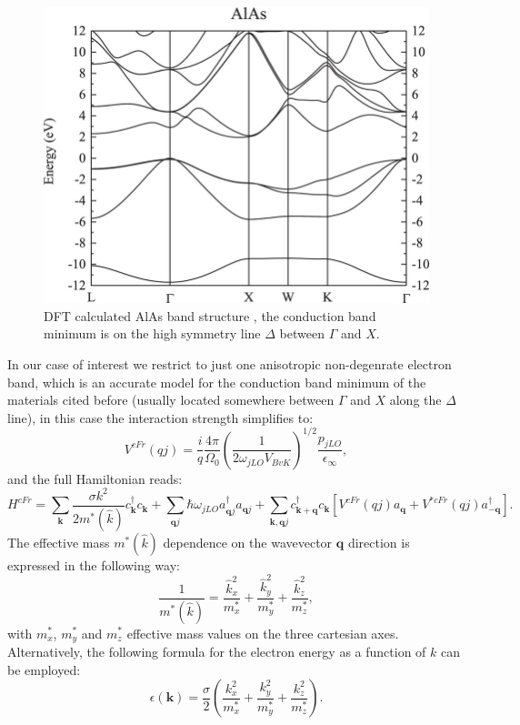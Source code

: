 \begin{figure}[H]
    \centering
    \includegraphics[scale=1.0]{Electronic-band-structure-for-AlAs.jpg}
    \caption{DFT calculated AlAs band structure \cite{da2021pseudopotential}, the conduction band minimum is on the high symmetry 
    line $\Delta$ between $\Gamma$ and $X$.}
    \label{fig:AlAs_bands}
\end{figure}
In our case of interest we restrict to just one anisotropic non-degenrate electron band, which is an accurate model for the conduction band minimum of 
the materials cited before (usually located somewhere between $\Gamma$ and $X$ along the $\Delta$ line), in this case the interaction 
strength simplifies to:
\begin{equation}
    V^{cFr}(qj)=\frac{i}{q}\frac{4\pi}{\Omega_0}\left(\frac{1}{2\omega_{jLO}V_{BvK}}\right)^{1/2}\frac{p_{jLO}}{\epsilon_\infty},
    \label{coupling_strength_anisotropic}
\end{equation}
and the full Hamiltonian reads:
\begin{equation}
    H^{cFr}=\sum_{\mathbf{k}}\frac{\sigma k^2}{2m^*(\hat{k})}c^\dagger_\mathbf{k}c_\mathbf{k}+\sum_{\mathbf{q}j}\hbar\omega_{jLO}a^\dagger_{\mathbf{q}j}a_{\mathbf{q}j}+\sum_{\mathbf{k},\mathbf{q}j}c^\dagger_{\mathbf{k}+\mathbf{q}}c_\mathbf{k}\left[V^{cFr}(qj)a_\mathbf{q}+V^{*cFr}(qj)a^\dagger_\mathbf{-q}\right].
    \label{Froehlich_cubic_k_anisotropic}
\end{equation}
The effective mass $m^*(\hat{k})$ dependence on the wavevector $\mathbf{q}$ direction is expressed in the following way:
\begin{equation}
    \frac{1}{m^*(\hat{k})}=\frac{\hat{k}_x^2}{m^*_x}+\frac{\hat{k}_y^2}{m^*_y}+\frac{\hat{k}_z^2}{m^*_z},
    \label{effective_mass_anisotropic_relation}
\end{equation}
with $m^*_x$, $m^*_y$ and $m^*_z$ effective mass values on the three cartesian axes.\\
Alternatively, the following formula for the electron energy as a function of $k$ can be employed:
\begin{equation}
    \epsilon(\mathbf{k})=\frac{\sigma}{2}\left(\frac{k^2_x}{m^*_x}+\frac{k_y^2}{m^*_y}+\frac{k_z^2}{m^*_z}\right).
\end{equation}